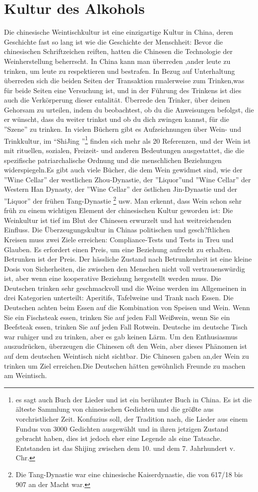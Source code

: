 \section{Kultur des Alkohols}
Die chinesische Weintischkultur ist eine einzigartige Kultur in China, deren Geschichte fast so lang ist wie die Geschichte der Menschheit: Bevor die chinesischen Schriftzeichen reiften, hatten die Chinesen die Technologie der Weinherstellung beherrscht. In China kann man überreden ,ander leute zu trinken, um leute zu  respektieren und bestrafen. In Bezug auf Unterhaltung überreden sich die beiden Seiten der Transaktion rmalerweise zum Trinken,was für beide Seiten eine Versuchung ist, und in der Führung des Trinkens ist dies auch die Verkörperung dieser entalität. Überrede den Trinker, über deinen Gehorsam zu urteilen, indem du beobachtest, ob du die Anweisungen befolgst, die er wünscht, dass du weiter trinkst und ob du dich zwingen kannst, für die ''Szene'' zu trinken. In vielen Büchern gibt es Aufzeichnungen über Wein- und Trinkkultur, im “ShiJing ”\footnote{es sagt auch Buch der Lieder und ist ein  berühmter Buch in China. Es ist die älteste Sammlung von chinesischen Gedichten und die größte aus vorchristlicher Zeit. Konfuzius soll, der Tradition nach, die Lieder aus einem Fundus von 3000 Gedichten ausgewählt und in ihren jetzigen Zustand gebracht haben, dies ist jedoch eher eine Legende als eine Tatsache. Entstanden ist das Shijing zwischen dem 10. und dem 7. Jahrhundert v. Chr.} finden sich mehr als 20 Referenzen, und der Wein ist mit rituellen, sozialen, Freizeit- und anderen Bedeutungen ausgestattet, die die spezifische patriarchalische Ordnung und die menschlichen Beziehungen widerspiegeln.Es gibt auch viele Bücher, die dem Wein gewidmet sind, wie der ''Wine Cellar'' der westlichen Zhou-Dynastie, der ''Liquor''und ''Wine Cellar'' der Western Han Dynasty,  der ''Wine Cellar'' der östlichen Jin-Dynastie und der ''Liquor'' der frühen Tang-Dynastie \footnote{Die Tang-Dynastie war eine chinesische Kaiserdynastie, die von 617/18 bis 907 an der Macht war. } usw. Man erkennt, dass Wein schon sehr früh zu einem wichtigen Element der chinesischen Kultur geworden ist: Die Weinkultur ist tief im Blut der Chinesen erwurzelt und hat weitreichenden Einfluss. Die Überzeugungskultur in Chinas politischen und gesch?ftlichen Kreisen muss zwei Ziele erreichen: Compliance-Tests und Tests in Treu und Glauben. Es erfordert einen Preis, um eine Beziehung aufrecht zu erhalten. Betrunken ist der Preis. Der hässliche Zustand nach Betrunkenheit ist eine kleine Dosis von Sicherheiten, die zwischen den Menschen nicht voll vertrauenswürdig ist, aber wenn eine kooperative Beziehung hergestellt werden muss. Die Deutschen trinken sehr  geschmackvoll und die Weine werden im Allgemeinen in drei Kategorien unterteilt: Aperitifs, Tafelweine und Trank nach Essen. Die Deutschen achten beim Essen auf die Kombination von Speisen und Wein. Wenn Sie ein Fischsteak essen, trinken Sie auf jeden Fall Wei\ss wein, wenn Sie ein Beefsteak essen, trinken Sie auf jeden Fall Rotwein. Deutsche im  deutsche Tisch war ruhiger und zu trinken, aber es gab keinen Lärm. Um den Enthusiasmus auszudrücken, überzeugen die Chinesen oft den Wein, aber dieses Phänomen ist auf dem deutschen Weintisch nicht sichtbar. Die Chinesen gaben an,der Wein zu trinken um Ziel erreichen.Die Deutschen hätten 
gewöhnlich Freunde zu machen am Weintisch.

